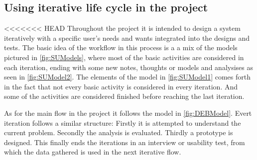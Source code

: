 \subsection{Using iterative life cycle in the project}
<<<<<<< HEAD
Throughout the project it is intended to design a system iteratively with a specific user’s needs and wants integrated into the designs and tests. 
The basic idea of the workflow in this process is a a mix of the models pictured in \cref{fig:SUModels}, where most of the basic activities are considered in each iteration, ending with some new notes, thoughts or models and analysises as seen in \cref{fig:SUModel2}.
The elements of the model in \cref{fig:SUModel1} comes forth in the fact that not every basic activity is considered in every iteration. And some of the activities are considered finished before reaching the last iteration.

As for the main flow in the project it follows the model in \cref{fig:DEBModel}.
Evert iteration follows a similar structure:
Firstly it is attempted to understand the current problem.
Secondly the analysis is evaluated.
Thirdly a prototype is designed.
This finally ends the iterations in an interview or usability test, from which the data gathered is used in the next iterative flow.

